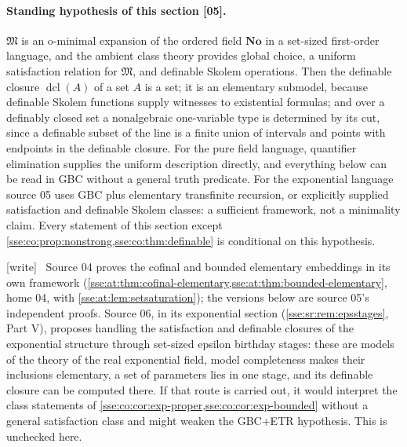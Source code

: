 \documentclass[11pt,a4paper]{article}
\numberwithin{equation}{section}
\theoremstyle{plain}
\theoremstyle{definition}
\theoremstyle{remark}
\newcommand{\No}{\mathbf{No}}
\newcommand{\src}[1]{\textup{\textsf{\small[#1]}}}%
\newcommand{\wtag}{\textup{\textsf{[write]}}}%
\newenvironment{wnote}{\par\smallskip\noindent\wtag\ }{\par\smallskip}
\newcommand{\dclco}{\operatorname{dcl}}%
\begin{document}
\paragraph{Standing hypothesis of this section \src{05}.} $\mathfrak M$ is an
o-minimal expansion of the ordered field $\No$ in a set-sized first-order
language, and the ambient class theory provides global choice, a uniform
satisfaction relation for $\mathfrak M$, and definable Skolem operations.
Then the definable closure $\dclco(A)$ of a set $A$ is a set; it is an
elementary submodel, because definable Skolem functions supply witnesses to
existential formulas; and over a definably closed set a nonalgebraic
one-variable type is determined by its cut, since a definable subset of the
line is a finite union of intervals and points with endpoints in the
definable closure. For the pure field language, quantifier elimination
supplies the uniform description directly, and everything below can be read
in GBC without a general truth predicate. For the exponential language
source 05 uses GBC plus elementary transfinite recursion, or explicitly
supplied satisfaction and definable Skolem classes: a sufficient framework,
not a minimality claim. Every statement of this section except
\cref{sse:co:prop:nonstrong,sse:co:thm:definable} is conditional on this
hypothesis.
\begin{wnote}
Source 04 proves the cofinal and bounded elementary embeddings in its own
framework (\cref{sse:at:thm:cofinal-elementary,sse:at:thm:bounded-elementary},
home 04, with \cref{sse:at:lem:setsaturation}); the versions below are
source 05's independent proofs. Source 06, in its exponential section
(\cref{sse:sr:rem:epsstages}, Part V), proposes handling the satisfaction
and definable closures of the exponential structure through set-sized
epsilon birthday stages: these are models of the theory of the real
exponential field, model completeness makes their inclusions elementary, a
set of parameters lies in one stage, and its definable closure can be
computed there. If that route is carried out, it would interpret the class
statements of \cref{sse:co:cor:exp-proper,sse:co:cor:exp-bounded} without a
general satisfaction class and might weaken the GBC+ETR hypothesis. This is
unchecked here.
\end{wnote}
\end{document}
